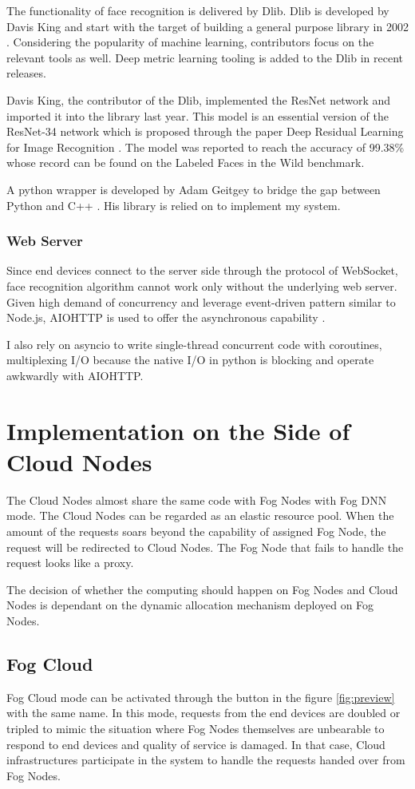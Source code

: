 The functionality of face recognition is delivered by Dlib. Dlib is developed by Davis King and start with the target of building a general purpose library in 2002 \cite{dlib09}. Considering the popularity of machine learning, contributors focus on the relevant tools as well. Deep metric learning tooling is added to the Dlib in recent releases.

Davis King, the contributor of the Dlib, implemented the ResNet network and imported it into the library last year. This model is an essential version of the ResNet-34 network which is proposed through the paper Deep Residual Learning for Image Recognition  \cite{he2016deep}. The model was reported to reach the accuracy of 99.38\% whose record can be found on the Labeled Faces in the Wild benchmark.

A python wrapper is developed by Adam Geitgey to bridge the gap between Python and C++ \cite{python-facerecognition}. His library is relied on to implement my system.

\subsubsection{Web Server}
Since end devices connect to the server side through the protocol of WebSocket, face recognition algorithm cannot work only without the underlying web server. Given high demand of concurrency and leverage event-driven pattern similar to Node.js, AIOHTTP is used to offer the asynchronous capability \cite{python-aiohttp}.

I also rely on asyncio to write single-thread concurrent code with coroutines, multiplexing I/O because the native I/O in python is blocking and operate awkwardly with AIOHTTP. 

\section{Implementation on the Side of Cloud Nodes}
The Cloud Nodes almost share the same code with Fog Nodes with Fog DNN mode. The Cloud Nodes can be regarded as an elastic resource pool. When the amount of the requests soars beyond the capability of assigned Fog Node, the request will be redirected to Cloud Nodes. The Fog Node that fails to handle the request looks like a proxy.

The decision of whether the computing should happen on Fog Nodes and Cloud Nodes is dependant on the dynamic allocation mechanism deployed on Fog Nodes.

\subsection{Fog Cloud}
Fog Cloud mode can be activated through the button in the figure \ref{fig:preview} with the same name. In this mode, requests from the end devices are doubled or tripled to mimic the situation where Fog Nodes themselves are unbearable to respond to end devices and quality of service is damaged. In that case, Cloud infrastructures participate in the system to handle the requests handed over from Fog Nodes.

